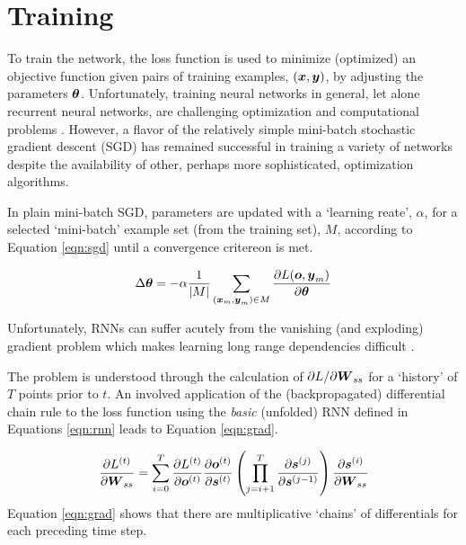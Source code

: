 \section{Training}


To train the network, the loss function is used to  minimize (optimized) an objective function given pairs of training examples, $(\boldsymbol{x},\boldsymbol{y})$, by adjusting the parameters $\boldsymbol{\theta}$. Unfortunately, training neural networks in general, let alone recurrent neural networks, are challenging optimization and computational problems \cite{Blum1992}. However, a flavor of the relatively simple mini-batch stochastic gradient descent (SGD) has remained successful in training a variety of networks \cite{Bengio2012b} despite the availability of other, perhaps more sophisticated, optimization algorithms. %

In plain mini-batch SGD, parameters are updated with a `learning reate', $\alpha$, for a selected `mini-batch' example set (from the training set), $M$, according to Equation \ref{eqn:sgd} until a convergence critereon is met.

\begin{equation}
  \label{eqn:sgd}
   \Delta \vc{\theta} =
   -\alpha
   \frac{1}{|M|} \sum_{(\vc{x}_m,\vc{y}_m) \in M}
   \frac{\partial{L}(
     \vc{o}%
     ,\vc{y}_m)}
   {\partial{\vc{\theta}}}
\end{equation}

Unfortunately, RNNs can suffer acutely from the vanishing (and exploding) gradient problem which makes learning long range dependencies difficult \cite{Hochreiter,Bengio1994,Doya1992,Pascanu2013c}.

The problem is understood through the calculation of $\partial{L}/\partial{\ensuremath{\boldsymbol{W}}_{ss}}$ for a `history' of $T$ points prior to $t$.
%
An involved application of the (backpropagated) differential chain rule to the loss function using the \emph{basic} (unfolded) RNN defined in Equations \ref{eqn:rnn} leads to Equation \ref{eqn:grad}.

\begin{equation}
  \label{eqn:grad}
  \frac{\partial{L}\sp{(t)}}{\partial{\ensuremath{\boldsymbol{W}}_{ss}}} = 
  \sum_{i=0}^T
  \frac{\partial{    L}\sp{( t)}}{\partial{\ensuremath{\boldsymbol{o}}\ensuremath{\sp{(t)}}}}
  \frac{\partial{\ensuremath{\boldsymbol{o}}}\sp{(t)}}{\partial{\ensuremath{\boldsymbol{s}}\ensuremath{\sp{(t)}}}}
  \left(
    \prod_{j=i+1}^{T}
    \frac{\partial{\ensuremath{\boldsymbol{s}}}\sp{(j)}}{\partial{\ensuremath{\boldsymbol{s}}\ensuremath{\sp{(j-1)}}}}
  \right)
  \frac{\partial{\ensuremath{\boldsymbol{s}}}\sp{(i)}}{\partial{\ensuremath{\boldsymbol{W}}_{ss}}}
\end{equation}
%
\noindent
Equation \ref{eqn:grad} shows that there are multiplicative `chains' of differentials for each preceding time step. 

